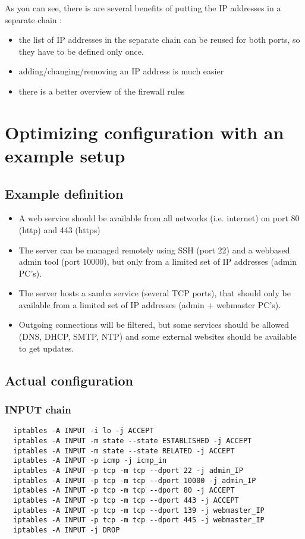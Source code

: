 \documentclass[a4paper,12pt]{article}
\begin{document}
As you can see, there is are several benefits of putting the IP addresses in a separate chain :
\begin{itemize}
    \item the list of IP addresses in the separate chain can be reused for both ports, so they have to be defined only once.
    \item adding/changing/removing an IP address is much easier
    \item there is a better overview of the firewall rules
\end{itemize}

\section{Optimizing configuration with an example setup}
\subsection{Example definition}
\begin{itemize}
  \item A web service should be available from all networks (i.e. internet) on port 80 (http) and 443 (https)
  \item The server can be managed remotely using SSH (port 22) and a webbased admin tool (port 10000), but only from a limited set of IP addresses (admin PC's).
  \item The server hosts a samba service (several TCP ports), that should only be available from a limited set of IP addresses (admin + webmaster PC's).
  \item Outgoing connections will be filtered, but some services should be allowed (DNS, DHCP, SMTP, NTP) and some external websites should be available to get updates.
\end{itemize}

\subsection{Actual configuration}

\subsubsection{INPUT chain}

\begin{verbatim}
  iptables -A INPUT -i lo -j ACCEPT
  iptables -A INPUT -m state --state ESTABLISHED -j ACCEPT
  iptables -A INPUT -m state --state RELATED -j ACCEPT
  iptables -A INPUT -p icmp -j icmp_in
  iptables -A INPUT -p tcp -m tcp --dport 22 -j admin_IP
  iptables -A INPUT -p tcp -m tcp --dport 10000 -j admin_IP
  iptables -A INPUT -p tcp -m tcp --dport 80 -j ACCEPT
  iptables -A INPUT -p tcp -m tcp --dport 443 -j ACCEPT
  iptables -A INPUT -p tcp -m tcp --dport 139 -j webmaster_IP
  iptables -A INPUT -p tcp -m tcp --dport 445 -j webmaster_IP
  iptables -A INPUT -j DROP
\end{verbatim}
\end{document}
